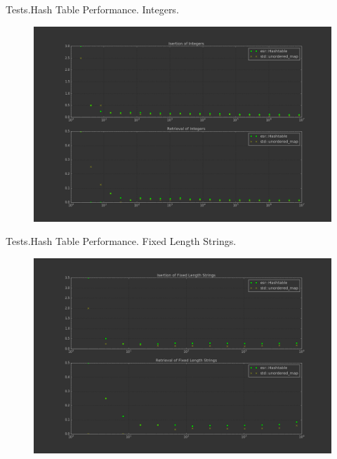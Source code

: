 \documentclass{beamer}
\begin{document}
\begin{frame}{Tests.}{Hash Table Performance. Integers.}
  \begin{figure}
    \includegraphics[scale=0.3]{pictures/int_perf}
  \end{figure}
\end{frame}

\begin{frame}{Tests.}{Hash Table Performance. Fixed Length Strings.}
  \begin{figure}
    \includegraphics[scale=0.3]{pictures/fstr_perf}
  \end{figure}
\end{frame}
\end{document}
